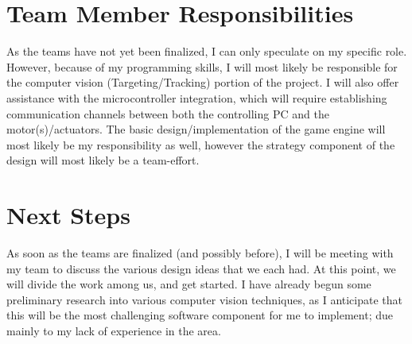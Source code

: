 \documentclass[letterpaper,10pt,onecolumn,titlepage]{article}
\begin{document}
\section{Team Member Responsibilities}
As the teams have not yet been finalized, I can only speculate on my specific
role.  However, because of my programming skills, I will most likely be
responsible for the computer vision (Targeting/Tracking) portion of the project.
I will also offer assistance with the microcontroller integration, which will
require establishing communication channels between both the controlling PC and
the motor(s)/actuators.  The basic design/implementation of the game engine
will most likely be my responsibility as well, however the strategy component
of the design will most likely be a team-effort.

\section{Next Steps}
As soon as the teams are finalized (and possibly before), I will be meeting with
my team to discuss the various design ideas that we each had.  At this point,
we will divide the work among us, and get started.  I have already begun
some preliminary research into various computer vision techniques, as 
I anticipate that this will be the most challenging software component for 
me to implement; due mainly to my lack of experience in the area.
\end{document}
